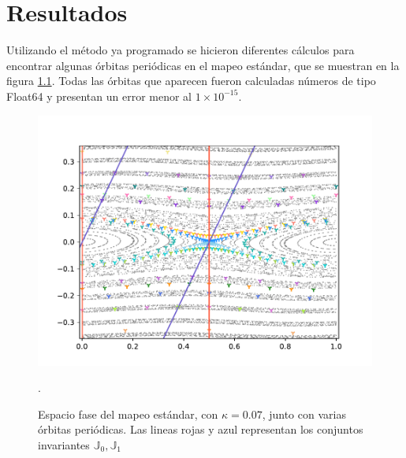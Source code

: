 
\chapter{Resultados}

Utilizando el método ya programado se hicieron diferentes cálculos para encontrar algunas \'orbitas peri\'odicas en el mapeo est\'andar, que se muestran en la figura \ref{orbitasperiodicasestandarv}. Todas las \'orbitas que aparecen fueron calculadas n\'umeros de tipo \textrm{Float64} y presentan un error menor al $1\times10^{-15}$.
\begin{figure}[H]
	\centering
	\includegraphics[scale= 0.7]{EstandarOP07}
	\label{orbitasperiodicasestandarv}
	\caption{Espacio fase del mapeo est\'andar, con $\kappa = 0.07$, junto con varias \'orbitas peri\'odicas. Las lineas rojas y azul representan los conjuntos invariantes $\mathbb{J}_{0},\mathbb{J}_{1}$}.
\end{figure}
